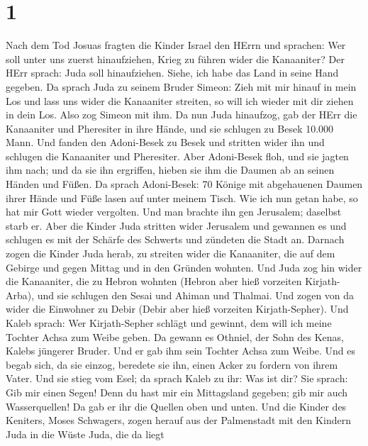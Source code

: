 \hypertarget{section}{%
\section{1}\label{section}}

 Nach dem Tod Josuas fragten die Kinder Israel den HErrn und
sprachen: Wer soll unter uns zuerst hinaufziehen, Krieg zu führen wider
die Kanaaniter?  Der HErr sprach: Juda soll hinaufziehen.
Siehe, ich habe das Land in seine Hand gegeben.  Da sprach
Juda zu seinem Bruder Simeon: Zieh mit mir hinauf in mein Los und lass
uns wider die Kanaaniter streiten, so will ich wieder mit dir ziehen in
dein Los. Also zog Simeon mit ihm.  Da nun Juda hinaufzog,
gab der HErr die Kanaaniter und Pheresiter in ihre Hände, und sie
schlugen zu Besek 10.000 Mann.  Und fanden den Adoni-Besek
zu Besek und stritten wider ihn und schlugen die Kanaaniter und
Pheresiter.  Aber Adoni-Besek floh, und sie jagten ihm nach;
und da sie ihn ergriffen, hieben sie ihm die Daumen ab an seinen Händen
und Füßen.  Da sprach Adoni-Besek: 70 Könige mit abgehauenen
Daumen ihrer Hände und Füße lasen auf unter meinem Tisch. Wie ich nun
getan habe, so hat mir Gott wieder vergolten. Und man brachte ihn gen
Jerusalem; daselbst starb er.  Aber die Kinder Juda stritten
wider Jerusalem und gewannen es und schlugen es mit der Schärfe des
Schwerts und zündeten die Stadt an.  Darnach zogen die
Kinder Juda herab, zu streiten wider die Kanaaniter, die auf dem Gebirge
und gegen Mittag und in den Gründen wohnten.  Und Juda zog
hin wider die Kanaaniter, die zu Hebron wohnten (Hebron aber hieß
vorzeiten Kirjath-Arba), und sie schlugen den Sesai und Ahiman und
Thalmai.  Und zogen von da wider die Einwohner zu Debir
(Debir aber hieß vorzeiten Kirjath-Sepher).  Und Kaleb
sprach: Wer Kirjath-Sepher schlägt und gewinnt, dem will ich meine
Tochter Achsa zum Weibe geben.  Da gewann es Othniel, der
Sohn des Kenas, Kalebs jüngerer Bruder. Und er gab ihm sein Tochter
Achsa zum Weibe.  Und es begab sich, da sie einzog,
beredete sie ihn, einen Acker zu fordern von ihrem Vater. Und sie stieg
vom Esel; da sprach Kaleb zu ihr: Was ist dir?  Sie sprach:
Gib mir einen Segen! Denn du hast mir ein Mittagsland gegeben; gib mir
auch Wasserquellen! Da gab er ihr die Quellen oben und unten.
 Und die Kinder des Keniters, Moses Schwagers, zogen herauf
aus der Palmenstadt mit den Kindern Juda in die Wüste Juda, die da liegt
